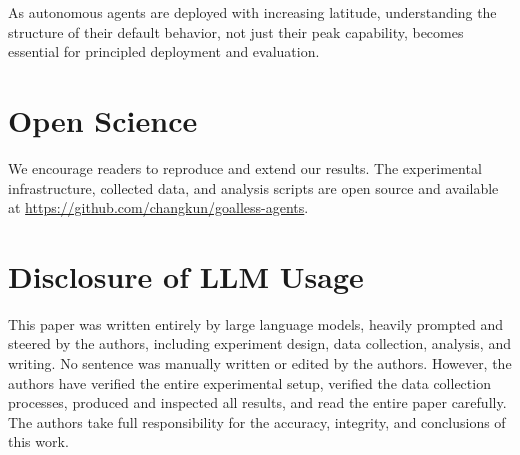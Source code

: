 \documentclass{article}
\begin{document}
As autonomous agents are deployed with increasing latitude,
understanding the structure of their default behavior, not just
their peak capability, becomes essential for principled
deployment and evaluation.


\section*{Open Science}
We encourage readers to reproduce and extend our results.
The experimental infrastructure, collected data, and analysis
scripts are open source and available at
\url{https://github.com/changkun/goalless-agents}.

\section*{Disclosure of LLM Usage}
This paper was written entirely by large language models, heavily
prompted and steered by the authors, including experiment design,
data collection, analysis, and writing. No sentence was manually written or edited by the authors.
However, the authors have verified the entire experimental setup,
verified the data collection processes, produced and inspected all
results, and read the entire paper carefully. The authors take
full responsibility for the accuracy, integrity, and conclusions
of this work.



\end{document}
